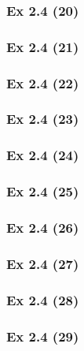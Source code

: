 \subsubsection{Ex 2.4 (20)}\label{sec:Ex_2.4.20}

\newpage		%

\subsubsection{Ex 2.4 (21)}\label{sec:Ex_2.4.21}

\subsubsection{Ex 2.4 (22)}\label{sec:Ex_2.4.22}

\subsubsection{Ex 2.4 (23)}\label{sec:Ex_2.4.23}

\subsubsection{Ex 2.4 (24)}\label{sec:Ex_2.4.24}

\subsubsection{Ex 2.4 (25)}\label{sec:Ex_2.4.25}

\subsubsection{Ex 2.4 (26)}\label{sec:Ex_2.4.26}

\subsubsection{Ex 2.4 (27)}\label{sec:Ex_2.4.27}

\subsubsection{Ex 2.4 (28)}\label{sec:Ex_2.4.28}

\subsubsection{Ex 2.4 (29)}\label{sec:Ex_2.4.29}

